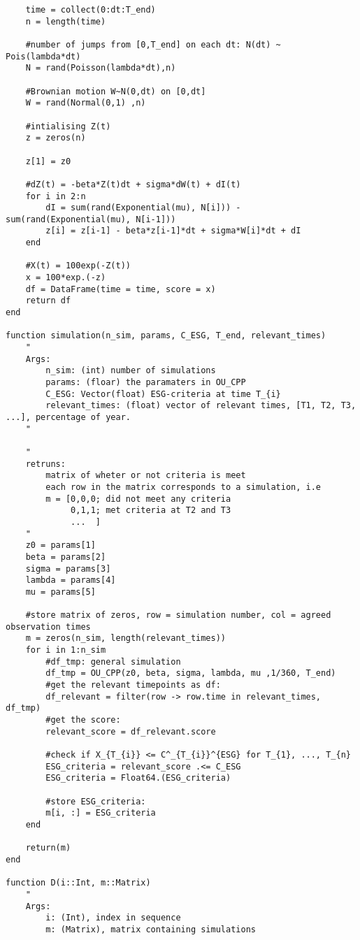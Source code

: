\begin{verbatim}
    time = collect(0:dt:T_end) 
    n = length(time)

    #number of jumps from [0,T_end] on each dt: N(dt) ~ Pois(lambda*dt)
    N = rand(Poisson(lambda*dt),n) 

    #Brownian motion W~N(0,dt) on [0,dt]
    W = rand(Normal(0,1) ,n)

    #intialising Z(t)
    z = zeros(n)

    z[1] = z0

    #dZ(t) = -beta*Z(t)dt + sigma*dW(t) + dI(t)
    for i in 2:n 
        dI = sum(rand(Exponential(mu), N[i])) - sum(rand(Exponential(mu), N[i-1]))
        z[i] = z[i-1] - beta*z[i-1]*dt + sigma*W[i]*dt + dI
    end

    #X(t) = 100exp(-Z(t))
    x = 100*exp.(-z)
    df = DataFrame(time = time, score = x)
    return df
end

function simulation(n_sim, params, C_ESG, T_end, relevant_times)
    "
    Args:
        n_sim: (int) number of simulations 
        params: (floar) the paramaters in OU_CPP
        C_ESG: Vector(float) ESG-criteria at time T_{i}            
        relevant_times: (float) vector of relevant times, [T1, T2, T3, ...], percentage of year.
    "

    "
    retruns:
        matrix of wheter or not criteria is meet
        each row in the matrix corresponds to a simulation, i.e
        m = [0,0,0; did not meet any criteria
             0,1,1; met criteria at T2 and T3
             ...  ] 
    "
    z0 = params[1]
    beta = params[2]
    sigma = params[3]
    lambda = params[4]
    mu = params[5]

    #store matrix of zeros, row = simulation number, col = agreed observation times
    m = zeros(n_sim, length(relevant_times))
    for i in 1:n_sim
        #df_tmp: general simulation 
        df_tmp = OU_CPP(z0, beta, sigma, lambda, mu ,1/360, T_end)
        #get the relevant timepoints as df:
        df_relevant = filter(row -> row.time in relevant_times, df_tmp)
        #get the score:
        relevant_score = df_relevant.score
    
        #check if X_{T_{i}} <= C^_{T_{i}}^{ESG} for T_{1}, ..., T_{n}
        ESG_criteria = relevant_score .<= C_ESG 
        ESG_criteria = Float64.(ESG_criteria)
        
        #store ESG_criteria:
        m[i, :] = ESG_criteria
    end

    return(m)
end

function D(i::Int, m::Matrix)
    " 
    Args:
        i: (Int), index in sequence 
        m: (Matrix), matrix containing simulations


\end{verbatim}

